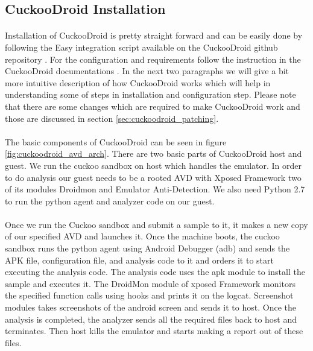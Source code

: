 \documentclass[../main.tex]{subfile}
\begin{document}
		\subsection{CuckooDroid Installation}\label{sec:cuckoodroid_installation}
		\paragraph{} Installation of CuckooDroid is pretty straight forward and can be easily done by following the Easy integration script available on the CuckooDroid github repository \cite{cuckoodroid_github}. For the configuration and requirements follow the instruction in the CuckooDroid documentations \cite{cuckoodroid_docs}. In the next two paragraphs we will give a bit more intuitive description of how CuckooDroid works which will help in understanding some of steps in installation and configuration step. Please note that there are some changes which are required to make CuckooDroid work and those are discussed in section \ref{sec:cuckoodroid_patching}.
		\paragraph{} The basic components of CuckooDroid can be seen in figure \ref{fig:cuckoodroid_avd_arch}. There are two basic parts of CuckooDroid host and guest. We run the cuckoo sandbox on host which handles the emulator. In order to do analysis our guest needs to be a rooted AVD with Xposed Framework \cite{xposed_module_repo} two of its modules Droidmon and Emulator Anti-Detection. We also need Python 2.7 to run the python agent and analyzer code on our guest.
		\paragraph{} Once we run the Cuckoo sandbox and submit a sample to it, it makes a new copy of our specified AVD and launches it. Once the machine boots, the cuckoo sandbox runs the python agent using Android Debugger (adb) and sends the APK file, configuration file, and analysis code to it and orders it to start executing the analysis code. The analysis code uses the apk module to install the sample and executes it. The DroidMon module of xposed Framework monitors the specified function calls using hooks and prints it on the logcat. Screenshot modules takes screenshots of the android screen and sends it to host. Once the analysis is completed, the analyzer sends all the required files back to host and terminates. Then host kills the emulator and starts making a report out of these files.
\end{document}
